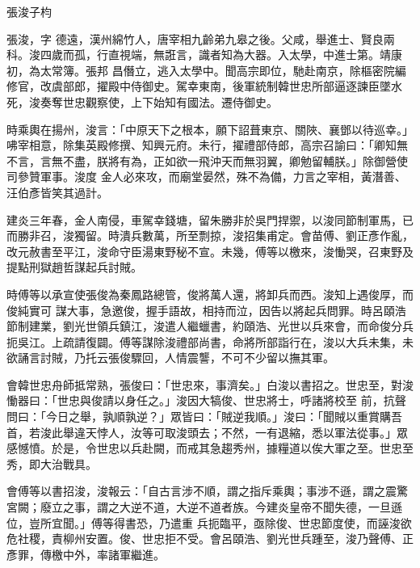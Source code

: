 
\begin{pinyinscope}

 張浚子枃



 張浚，字
 德遠，漢州綿竹人，唐宰相九齡弟九皋之後。父咸，舉進士、賢良兩科。浚四歲而孤，行直視端，無誑言，識者知為大器。入太學，中進士第。靖康初，為太常簿。張邦
 昌僭立，逃入太學中。聞高宗即位，馳赴南京，除樞密院編修官，改虞部郎，擢殿中侍御史。駕幸東南，後軍統制韓世忠所部逼逐諫臣墜水死，浚奏奪世忠觀察使，上下始知有國法。遷侍御史。



 時乘輿在揚州，浚言：「中原天下之根本，願下詔葺東京、關陜、襄鄧以待巡幸。」咈宰相意，除集英殿修撰、知興元府。未行，擢禮部侍郎，高宗召諭曰：「卿知無不言，言無不盡，朕將有為，正如欲一飛沖天而無羽翼，卿勉留輔朕。」除御營使司參贊軍事。浚度
 金人必來攻，而廟堂晏然，殊不為備，力言之宰相，黃潛善、汪伯彥皆笑其過計。



 建炎三年春，金人南侵，車駕幸錢塘，留朱勝非於吳門捍禦，以浚同節制軍馬，已而勝非召，浚獨留。時潰兵數萬，所至剽掠，浚招集甫定。會苗傅、劉正彥作亂，改元赦書至平江，浚命守臣湯東野秘不宣。未幾，傅等以檄來，浚慟哭，召東野及提點刑獄趙哲謀起兵討賊。



 時傅等以承宣使張俊為秦鳳路總管，俊將萬人還，將卸兵而西。浚知上遇俊厚，而俊純實可
 謀大事，急邀俊，握手語故，相持而泣，因告以將起兵問罪。時呂頤浩節制建業，劉光世領兵鎮江，浚遣人繼蠟書，約頤浩、光世以兵來會，而命俊分兵扼吳江。上疏請復闢。傅等謀除浚禮部尚書，命將所部詣行在，浚以大兵未集，未欲誦言討賊，乃托云張俊驟回，人情震讋，不可不少留以撫其軍。



 會韓世忠舟師抵常熟，張俊曰：「世忠來，事濟矣。」白浚以書招之。世忠至，對浚慟器曰：「世忠與俊請以身任之。」浚因大犒俊、世忠將士，呼諸將校至
 前，抗聲問曰：「今日之舉，孰順孰逆？」眾皆曰：「賊逆我順。」浚曰：「聞賊以重賞購吾首，若浚此舉違天悖人，汝等可取浚頭去；不然，一有退縮，悉以軍法從事。」眾感憾憤。於是，令世忠以兵赴闕，而戒其急趨秀州，據糧道以俟大軍之至。世忠至秀，即大治戰具。



 會傅等以書招浚，浚報云：「自古言涉不順，謂之指斥乘輿；事涉不遜，謂之震驚宮闕；廢立之事，謂之大逆不道，大逆不道者族。今建炎皇帝不聞失德，一旦遜位，豈所宜聞。」傅等得書恐，乃遣重
 兵扼臨平，亟除俊、世忠節度使，而誣浚欲危社稷，責柳州安置。俊、世忠拒不受。會呂頤浩、劉光世兵踵至，浚乃聲傅、正彥罪，傳檄中外，率諸軍繼進。




\end{pinyinscope}
